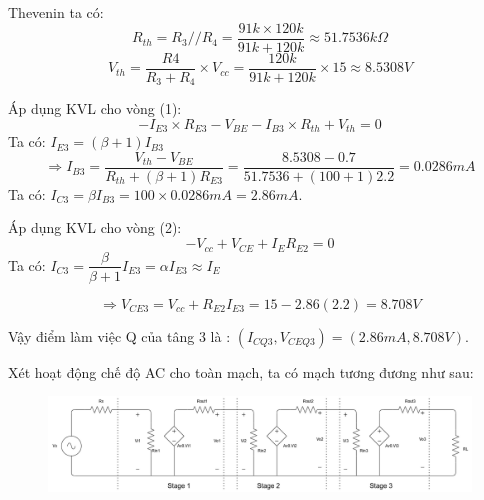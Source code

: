 \begin{itemize}[label=-]
		Thevenin ta có:
		\[ R_{th} = R_{3}//R_{4} = \dfrac{91k \times 120k}{91k + 120k} \approx 51.7536k \Omega \]
		\[ V_{th} = \dfrac{R4}{R_{3} + R_{4}}\times V_{cc} = \dfrac{120k}{91k + 120k}\times 15 \approx 8.5308V\]
		
		Áp dụng KVL cho vòng (1):
		\[ -I_{E3}\times R_{E3} - V_{BE} - I_{B3}\times R_{th} + V_{th} = 0 \]
		Ta có: $I_{E3} = (\beta + 1) I_{B3}$
		\[ \Rightarrow I_{B3} = \dfrac{V_{th} - V_{BE}}{R_{th} + (\beta + 1)R_{E3}} = \dfrac{8.5308 - 0.7}{51.7536 + (100+1)2.2} = 0.0286mA\]
		Ta có: $I_{C3} = \beta I_{B3} = 100\times 0.0286mA = 2.86mA$.
		
		Áp dụng KVL cho vòng (2):
		\[-V_{cc} + V_{CE} + I_{E}R_{E2} = 0 \]
		Ta có: $I_{C3} = \dfrac{\beta}{\beta + 1}I_{E3} = \alpha I_{E3} \approx I_{E}$
		
		\[ \Rightarrow V_{CE3} = V_{cc} + R_{E2}I_{E3} = 15 - 2.86(2.2) = 8.708V\]
		
		Vậy điểm làm việc Q của tâng 3 là : $(I_{CQ3}, V_{CEQ3}) = (2.86mA, 8.708V)$.
\end{itemize}


\noindent Xét hoạt động chế độ AC cho toàn mạch, ta có mạch tương đương như sau:

\begin{figure}[H]
	\centering
	\includegraphics[width=.9\linewidth]{./my-chapters/my-diagrams/Question6/caub_tongquat.png}
\end{figure}

